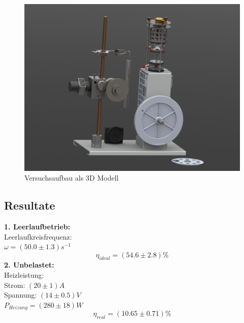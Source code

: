 \documentclass[12pt,a4paper]{article}
\begin{document}
\begin{multicols}{2}
\begin{figure}[H]
	\centering
	\includegraphics[scale=0.25]{./data/3D-Model/PS9-model_neutral01.JPG}
	\caption{Versuchsaufbau als 3D Modell}
	\label{fig:stirlingMotor_3D}
\end{figure}



\subsection{Resultate}
\textbf{1. Leerlaufbetrieb:}\\
Leerlaufkreisfrequenz:\\
$\omega=(50.0 \pm 1.3)s^{-1}$
$$\eta_{ideal}=(54.6 \pm 2.8)\%$$
\textbf{2. Unbelastet:}\\
Heizleistung:\\
Strom: $(20 \pm 1) A$\\
Spannung: $(14 \pm 0.5) V$\\
$P_{Heizung}=(280 \pm 18)W$\\
$$\eta_{real}=(10.65 \pm 0.71)\%$$\\

%
%
%
%




\end{multicols}
\end{document}
